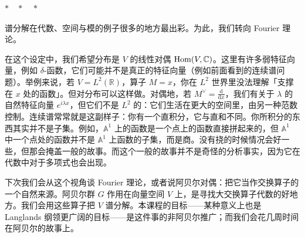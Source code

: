 \begin{center}
$\ast\quad\ast\quad\ast$
\end{center}

谱分解在代数、空间与模的例子很多的地方最出彩。为此，我们转向 Fourier 理论。

在这个设定中，我们希望分布是 $V$ 的线性对偶 $\operatorname{Hom}(V,\mathbb{C})$。这里有许多弱特征向量，例如 $\delta$-函数，它们可能并不是真正的特征向量（例如前面看到的连续谱问题）。举例来说，若 $V=L^2(\mathbb{R})$，算子 $M=x$，你在 $L^2$ 世界里没法理解「支撑在 $x$ 处的函数」。但对分布可以这样做。对偶地，若 $M^\vee=\frac{\mathrm{d}}{\mathrm{d}x}$，我们有关于 $\lambda$ 的自然特征向量 $e^{i\lambda x}$，但它们不是 $L^2$ 的：它们生活在更大的空间里，由另一种范数控制。连续谱常常就是这副样子：你有一个直积分，它与直和不同。你所积分的东西其实并不是子集。例如，$\mathbb{A}^1$ 上的函数是一个点上的函数直接拼起来的，但 $\mathbb{A}^1$ 中一个点处的函数并不是 $\mathbb{A}^1$ 上函数的子集，而是商。没有挠的时候情况会好一些，但那会掩盖一般的故事。而这个一般的故事并不是奇怪的分析事实，因为它在代数中对于多项式也会出现。

下次我们会从这个视角谈 Fourier 理论，或者说阿贝尔对偶：把它当作交换算子的一个自然来源。阿贝尔群 $G$ 作用在向量空间 $V$ 上，是寻找大交换算子代数的好地方。我们会用这些算子把 $V$ 谱分解。本课程的目标——某种意义上也是 Langlands 纲领更广阔的目标——是这件事的非阿贝尔推广；而我们会花几周时间在阿贝尔的故事上。
